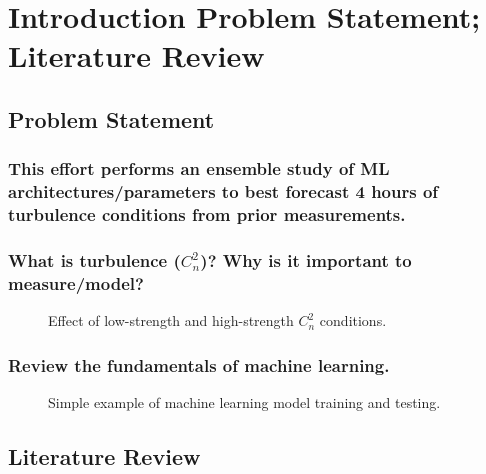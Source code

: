 \chapter{Introduction Problem Statement; Literature Review}
\label{ch1}

\section{Problem Statement}
\subsection{This effort performs an ensemble study of ML architectures/parameters to best forecast 4 hours of turbulence conditions from prior measurements.}

\subsection{What is turbulence ($C_{n}^{2}$)? Why is it important to measure/model?}
\begin{figure}[h!]
	\centering
	\hfill
	\caption{Effect of low-strength and high-strength $C_{n}^{2}$ conditions.}
	\label{fig:first_frames}
\end{figure}

\subsection{Review the fundamentals of machine learning.}

\begin{figure}[h!]
	\centering
	\hfill
	\hfill
	\caption{Simple example of machine learning model training and testing.}
	\label{fig:simple_model_training_testing}
\end{figure}

\section{Literature Review}

